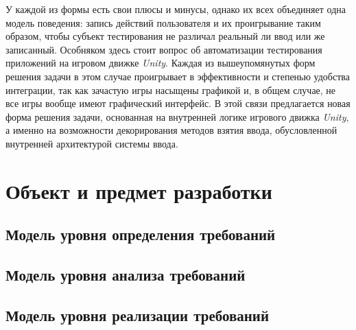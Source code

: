 У каждой из формы есть свои плюсы и минусы, однако их всех объединяет одна модель поведения: запись действий пользователя и их проигрывание таким образом, чтобы субъект тестирования не различал реальный ли ввод или же записанный. Особняком здесь стоит вопрос об автоматизации тестирования приложений на игровом движке \textit{Unity}. Каждая из вышеупомянутых форм решения задачи в этом случае проигрывает в эффективности и степенью удобства интеграции, так как зачастую игры насыщены графикой и, в общем случае, не все игры вообще имеют графический интерфейс. В этой связи предлагается новая форма решения задачи, основанная на внутренней логике игрового движка \textit{Unity}, а именно на возможности декорирования методов взятия ввода, обусловленной внутренней архитектурой системы ввода.

\section{Объект и предмет разработки}
\subsection{Модель уровня определения требований}
\subsection{Модель уровня анализа требований}
\subsection{Модель уровня реализации требований}